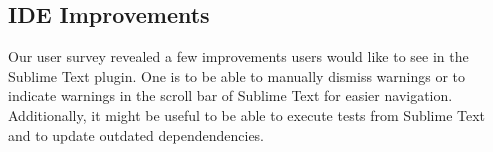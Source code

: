 \subsection{IDE Improvements}

Our user survey revealed a few improvements users would like to see in the Sublime Text plugin. One is to be able to manually dismiss warnings or to indicate warnings in the scroll bar of Sublime Text for easier navigation. Additionally, it might be useful to be able to execute tests from Sublime Text and to update outdated dependendencies. 
